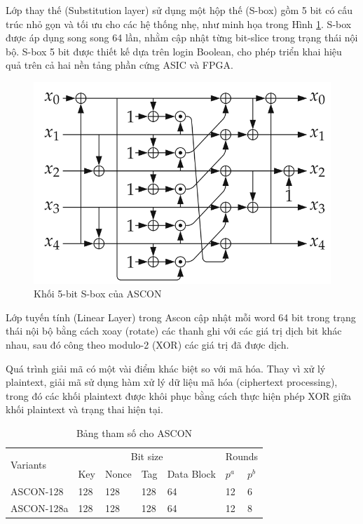 Lớp thay thế (Substitution layer) sử dụng một hộp thế (S-box) gồm 5 bit có cấu trúc nhỏ gọn và tối ưu cho các hệ thống nhẹ, như minh họa trong Hình \ref{fig:s-box}. S-box được áp dụng song song 64 lần, nhằm cập nhật từng bit-slice trong trạng thái nội bộ. S-box 5 bit được thiết kế dựa trên login Boolean, cho phép triển khai hiệu quả trên cả hai nền tảng phần cứng ASIC và FPGA.

\begin{figure}
    \centering
    \includegraphics[width=0.6\linewidth]{s-box.png}
    \caption{Khối 5-bit S-box của ASCON}
    \label{fig:s-box}
\end{figure}

Lớp tuyến tính (Linear Layer) trong Ascon cập nhật mỗi word 64 bit trong trạng thái nội bộ bằng cách xoay (rotate) các thanh ghi với các giá trị dịch bit khác nhau, sau đó công theo modulo-2 (XOR) các giá trị đã được dịch.

Quá trình giải mã có một vài điểm khác biệt so với mã hóa. Thay vì xử lý plaintext, giải mã sử dụng hàm xử lý dữ liệu mã hóa (ciphertext processing), trong đó các khối plaintext được khôi phục bằng cách thực hiện phép XOR giữa khối plaintext và trạng thai hiện tại.

\begin{table}[ht]
\centering
\small
\caption{Bảng tham số cho ASCON}
\begin{tabular}{|p{3cm}|p{1.5cm}|p{1.5cm}|p{1.5cm}|p{2.8cm}|p{1cm}|p{1cm}|}
    \hline
    \multirow{2}{*}{Variants} & \multicolumn{4}{c|}{Bit size} & \multicolumn{2}{c|}{Rounds} \\
    \cline{2-7}
    & Key & Nonce & Tag & Data Block & $p^a$ & $p^b$ \\
    \hline
    ASCON-128 & 128 & 128 & 128 & 64 & 12 & 6 \\
    \hline
    ASCON-128a & 128 & 128 & 128 & 64 & 12 & 8 \\
    \hline
\end{tabular}
\label{tab:ascon_parameter}
\end{table}

